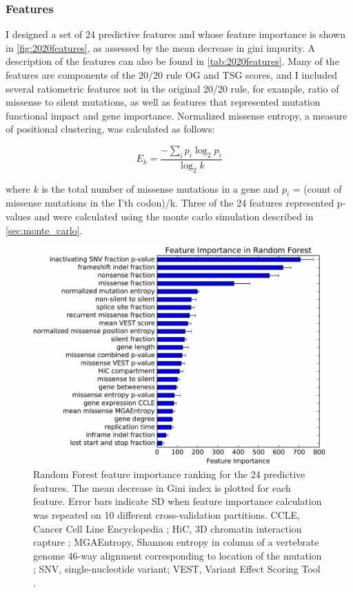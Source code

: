 \subsubsection{Features}

I designed a set of 24 predictive features and whose feature importance is shown in \autoref{fig:2020features}, as assessed by the mean decrease in gini impurity. A description of the features can also be found in \autoref{tab:2020features}. Many of the features are components of the 20/20 rule OG and TSG scores, and I included several ratiometric features not in the original 20/20 rule, for example, ratio of missense to silent mutations, as well as features that represented mutation functional impact and gene importance. Normalized missense entropy, a measure of positional clustering, was calculated as follows:

\begin{equation}
E_k = \frac{-\sum_i{p_i\log_2{p_i}}}{\log_2{k}}
\end{equation}

where $k$ is the total number of missense mutations in a gene and $p_i$ = (count of missense mutations in the I'th codon)/k. Three of the 24 features represented p-values and were calculated using the monte carlo simulation described in \autoref{sec:monte_carlo}.

\begin{figure}
  \centering
  \makeatletter
  \let\@currsize\normalsize
  \includegraphics[width=0.9\linewidth]{figures/chapter3/feature_importance.jpg}
  \caption[Random Forest feature importance ranking for the 24 predictive features.]{Random Forest feature importance ranking for the 24 predictive features. The mean decrease in Gini index is plotted for each feature. Error bars indicate SD when feature importance calculation was repeated on 10 different cross-validation partitions. CCLE, Cancer Cell Line Encyclopedia \cite{RN13}; HiC, 3D chromatin interaction capture \cite{RN13}; MGAEntropy, Shannon entropy in column of a vertebrate genome 46-way alignment corresponding to location of the mutation \cite{RN90}; SNV, single-nucleotide variant; VEST, Variant Effect Scoring Tool \cite{RN30}.}
  \label{fig:2020features}
\end{figure}

